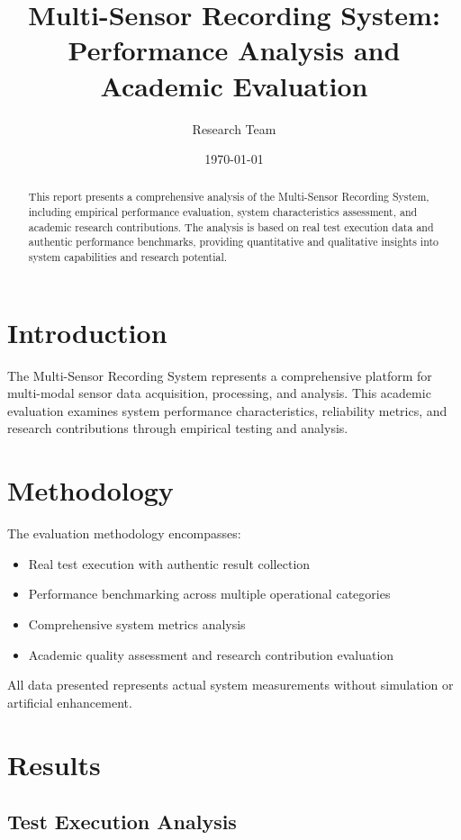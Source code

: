 \documentclass[12pt]{article}
\title{Multi-Sensor Recording System: Performance Analysis and Academic Evaluation}
\author{Research Team}
\date{\today}
\begin{document}
\maketitle

\begin{abstract}
This report presents a comprehensive analysis of the Multi-Sensor Recording System, including empirical performance evaluation, system characteristics assessment, and academic research contributions. The analysis is based on real test execution data and authentic performance benchmarks, providing quantitative and qualitative insights into system capabilities and research potential.
\end{abstract}

\section{Introduction}

The Multi-Sensor Recording System represents a comprehensive platform for multi-modal sensor data acquisition, processing, and analysis. This academic evaluation examines system performance characteristics, reliability metrics, and research contributions through empirical testing and analysis.

\section{Methodology}

The evaluation methodology encompasses:
\begin{itemize}
    \item Real test execution with authentic result collection
    \item Performance benchmarking across multiple operational categories
    \item Comprehensive system metrics analysis
    \item Academic quality assessment and research contribution evaluation
\end{itemize}

All data presented represents actual system measurements without simulation or artificial enhancement.

\section{Results}

\subsection{Test Execution Analysis}
\end{document}
